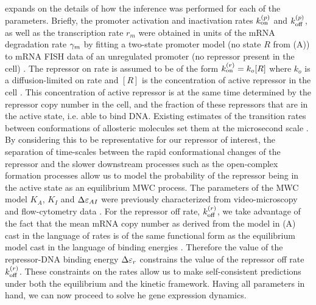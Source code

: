  expands on the details of how the inference was
performed for each of the parameters. Briefly, the promoter activation and
inactivation rates $k^{(p)}_{\text{on}}$ and $k^{(p)}_{\text{off}}$, as well as the transcription rate
$r_m$ were obtained in units of the mRNA degradation rate $\gamma _m$ by fitting a
two-state promoter model (no state $R$ from (A))
\cite{Peccoud1995} to mRNA FISH data of an unregulated promoter (no  repressor
present in the cell) \cite{Jones2014a}. The repressor on rate is assumed to be
of the form $k^{(r)}_{\text{on}} = k_o [R]$ where $k_o$ is a diffusion-limited on rate and
$[R]$ is the concentration of active repressor in the cell \cite{Jones2014a}.
This concentration of active repressor is at the same time determined by the
repressor copy number in the cell, and the fraction of these repressors  that
are in the active state, i.e. able to bind DNA. Existing estimates of the
transition rates between conformations of allosteric molecules set them at the
microsecond scale \cite{Cui2008}. By considering this to be representative for
our repressor of interest, the separation of time-scales between the rapid
conformational changes of the repressor and the slower downstream processes
such as the open-complex formation processes allow us to model the probability
of the repressor being in the active state as an equilibrium MWC process. The
parameters of the MWC model $K_A$, $K_I$ and $\Delta\varepsilon_{AI}$ were previously
characterized from video-microscopy and flow-cytometry data
\cite{Razo-Mejia2018}. For the repressor off rate, $k^{(r)}_{\text{off}}$, we take advantage
of the fact that the mean mRNA copy number as derived from the model in
(A) cast in the language of rates is of the same
functional form as the equilibrium model cast in the language of binding
energies \cite{Phillips2015}. Therefore the value of the repressor-DNA binding
energy $\Delta\varepsilon_r$ constrains the value of the repressor off rate $k^{(r)}_{\text{off}}$. These
constraints on the rates allow us to make self-consistent predictions under
both the equilibrium and the kinetic framework. Having all parameters in hand,
we can now proceed to solve he gene expression dynamics.

